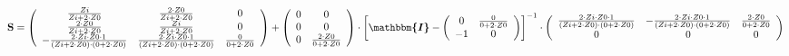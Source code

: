 \begin{equation} \mathbf{S} = \left(\begin{array}{ccc}
\frac{Zi}{Zi+2\cdot Z0} & \frac{2\cdot Z0}{Zi+2\cdot Z0} & 0 \\
\frac{2\cdot Z0}{Zi+2\cdot Z0} & \frac{Zi}{Zi+2\cdot Z0} & 0 \\
-\frac{2\cdot Zi\cdot Z0\cdot 1}{ (Zi+2\cdot Z0 )\cdot (0+2\cdot Z0 )}
& \frac{2\cdot Zi\cdot Z0\cdot 1}{ (Zi+2\cdot Z0 )\cdot (0+2\cdot Z0
)} & \frac{0}{0+2\cdot Z0} \end{array}\right) +
\left(\begin{array}{cc} 0 & 0 \\ 0 & 0 \\ 0 & \frac{2\cdot
Z0}{0+2\cdot Z0} \end{array}\right) \cdot \left[
\boldsymbol{\mathbbm{I}}  - \left(\begin{array}{cc} 0 &
\frac{0}{0+2\cdot Z0} \\ -1 & 0 \end{array}\right) \right]^{-1}
\cdot\left(\begin{array}{ccc} \frac{2\cdot Zi\cdot Z0\cdot 1}{
(Zi+2\cdot Z0 )\cdot (0+2\cdot Z0 )} & -\frac{2\cdot Zi\cdot Z0\cdot
1}{ (Zi+2\cdot Z0 )\cdot (0+2\cdot Z0 )} & \frac{2\cdot Z0}{0+2\cdot
Z0} \\ 0 & 0 & 0 \end{array}\right) \end{equation}
